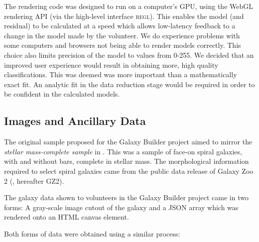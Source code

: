 \documentclass[../main.tex]{subfiles}
\begin{document}
The rendering code was designed to run on a computer's GPU, using the WebGL rendering API (via the high-level interface \textsc{regl}). This enables the model (and residual) to be calculated at a speed which allows low-latency feedback to a change in the model made by the volunteer. We do experience problems with some computers and browsers not being able to render models correctly. This choice also limits precision of the model to values from 0-255. We decided that an improved user experience would result in obtaining more, high quality classifications. This was deemed was more important than a mathematically exact fit. An analytic fit in the data reduction stage would be required in order to be confident in the calculated models.

\subsection{Images and Ancillary Data}
\label{sec:data}
The original sample proposed for the Galaxy Builder project aimed to mirror the \textit{stellar mass-complete sample} in \citet{Hart2017:1708.04628v1}. This was a sample of face-on spiral galaxies, with and without bars, complete in stellar mass. The morphological information required to select spiral galaxies came from the public data release of Galaxy Zoo 2 (\citealt{Willett2013:1308.3496v2}, hereafter GZ2).




The galaxy data shown to volunteers in the Galaxy Builder project came in two forms: A gray-scale image cutout of the galaxy and a JSON array which was rendered onto an HTML canvas element.

Both forms of data were obtained using a similar process:
\end{document}
